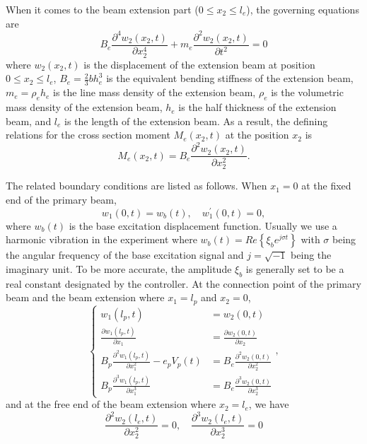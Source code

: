 \documentclass{elsarticle}
\begin{document}
When it comes to the beam extension part ($0 \leq x_2 \leq l_e$), the governing equations are
\begin{equation}
    B_e \frac{\partial^4 w_2(x_2,t)}{\partial x_2^4} + m_e \frac{\partial^2 w_2(x_2,t)}{\partial t^2} = 0
\end{equation}
where $w_2(x_2,t)$ is the displacement of the extension beam at position $0\leq x_2 \leq l_e$, $B_e = \frac{2}{3} b h_e^3$ is the equivalent bending stiffness of the extension beam, $m_e = \rho_e h_e$ is the line mass density of the extension beam, $\rho_e$ is the volumetric mass density of the extension beam, $h_e$ is the half thickness of the extension beam, and $l_e$ is the length of the extension beam. As a result, the defining relations for the cross section moment $M_e(x_2,t)$ at the position $x_2$ is
\begin{equation}
    M_e(x_2,t) = B_e \frac{\partial^2 w_2(x_2,t)}{\partial x_2^2}.
\end{equation}


The related boundary conditions are listed as follows. When $ x_1 = 0$ at the fixed end of the primary beam,
\begin{equation}
    w_1(0,t) = w_b(t), \quad w_1^\prime(0,t) = 0,
\end{equation}
where $w_b(t)$ is the base excitation displacement function. Usually we use a harmonic vibration in the experiment where $w_b(t) = Re \left\{ \xi_b e^{j \sigma t} \right\}$ with $\sigma$ being the angular frequency of the base excitation signal and $j = \sqrt{-1}$ being the imaginary unit. To be more accurate, the amplitude $\xi_b$ is generally set to be a real constant designated by the controller. At the connection point of the primary beam and the beam extension where $x_1 = l_p$ and $x_2 = 0$,
\begin{equation}
    \left\{\begin{aligned}
        w_1(l_p,t) &= w_2(0,t) \\
        \frac{\partial w_1(l_p,t)}{\partial x_1} &= \frac{\partial w_2(0,t)}{\partial x_2} \\
        B_p \frac{\partial^2 w_1(l_p,t)}{\partial x_1^2} - e_p V_p(t) &= B_e \frac{\partial^2 w_2(0,t)}{\partial x_2^2} \\
        B_p \frac{\partial^3 w_1(l_p,t)}{\partial x_1^3} &= B_e \frac{\partial^3 w_2(0,t)}{\partial x_2^3}
    \end{aligned}\right.,
\end{equation}
and at the free end of the beam extension where $x_2 = l_e$, we have
\begin{equation}
    \frac{\partial^2 w_2(l_e,t)}{\partial x_2^2} = 0, \quad \frac{\partial^3 w_2(l_e,t)}{\partial x_2^3} = 0
\end{equation}
\end{document}
